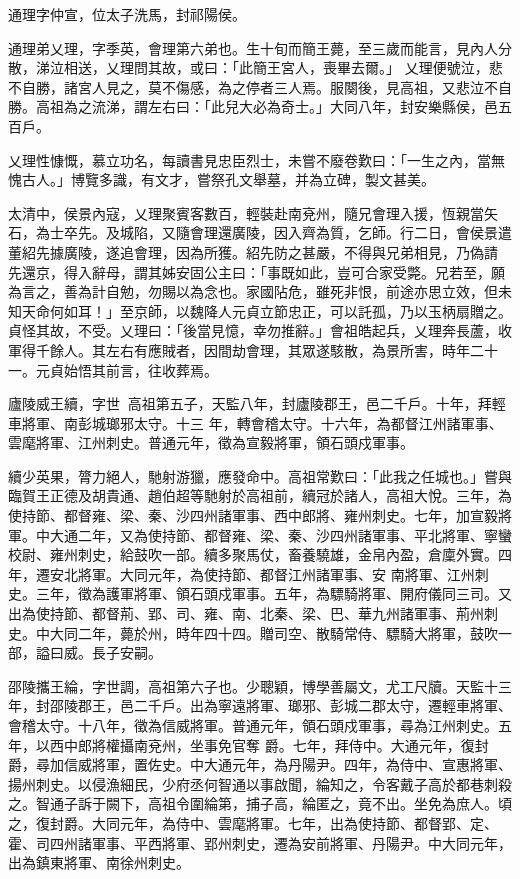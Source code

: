 \begin{pinyinscope}
 通理字仲宣，位太子洗馬，封祁陽侯。



 通理弟乂理，字季英，會理第六弟也。生十旬而簡王薨，至三歲而能言，見內人分散，涕泣相送，乂理問其故，或曰：「此簡王宮人，喪畢去爾。」
 乂理便號泣，悲不自勝，諸宮人見之，莫不傷感，為之停者三人焉。服闋後，見高祖，又悲泣不自勝。高祖為之流涕，謂左右曰：「此兒大必為奇士。」大同八年，封安樂縣侯，邑五百戶。



 乂理性慷慨，慕立功名，每讀書見忠臣烈士，未嘗不廢卷歎曰：「一生之內，當無愧古人。」博覽多識，有文才，嘗祭孔文舉墓，并為立碑，製文甚美。



 太清中，侯景內寇，乂理聚賓客數百，輕裝赴南兗州，隨兄會理入援，恆親當矢石，為士卒先。及城陷，又隨會理還廣陵，因入齊為質，乞師。行二日，會侯景遣董紹先據廣陵，遂追會理，因為所獲。紹先防之甚嚴，不得與兄弟相見，乃偽請
 先還京，得入辭母，謂其姊安固公主曰：「事既如此，豈可合家受斃。兄若至，願為言之，善為計自勉，勿賜以為念也。家國阽危，雖死非恨，前途亦思立效，但未知天命何如耳！」至京師，以魏降人元貞立節忠正，可以託孤，乃以玉柄扇贈之。貞怪其故，不受。乂理曰：「後當見憶，幸勿推辭。」會祖皓起兵，乂理奔長蘆，收軍得千餘人。其左右有應賊者，因間劫會理，其眾遂駭散，為景所害，時年二十一。元貞始悟其前言，往收葬焉。



 廬陵威王續，字世，高祖第五子，天監八年，封廬陵郡王，邑二千戶。十年，拜輕車將軍、南彭城瑯邪太守。十三
 年，轉會稽太守。十六年，為都督江州諸軍事、雲麾將軍、江州刺史。普通元年，徵為宣毅將軍，領石頭戍軍事。



 續少英果，膂力絕人，馳射游獵，應發命中。高祖常歎曰：「此我之任城也。」嘗與臨賀王正德及胡貴通、趙伯超等馳射於高祖前，續冠於諸人，高祖大悅。三年，為使持節、都督雍、梁、秦、沙四州諸軍事、西中郎將、雍州刺史。七年，加宣毅將軍。中大通二年，又為使持節、都督雍、梁、秦、沙四州諸軍事、平北將軍、寧蠻校尉、雍州刺史，給鼓吹一部。續多聚馬仗，畜養驍雄，金帛內盈，倉廩外實。四年，遷安北將軍。大同元年，為使持節、都督江州諸軍事、安
 南將軍、江州刺史。三年，徵為護軍將軍、領石頭戍軍事。五年，為驃騎將軍、開府儀同三司。又出為使持節、都督荊、郢、司、雍、南、北秦、梁、巴、華九州諸軍事、荊州刺史。中大同二年，薨於州，時年四十四。贈司空、散騎常侍、驃騎大將軍，鼓吹一部，謚曰威。長子安嗣。



 邵陵攜王綸，字世調，高祖第六子也。少聰穎，博學善屬文，尤工尺牘。天監十三年，封邵陵郡王，邑二千戶。出為寧遠將軍、瑯邪、彭城二郡太守，遷輕車將軍、會稽太守。十八年，徵為信威將軍。普通元年，領石頭戍軍事，尋為江州刺史。五年，以西中郎將權攝南兗州，坐事免官奪
 爵。七年，拜侍中。大通元年，復封爵，尋加信威將軍，置佐史。中大通元年，為丹陽尹。四年，為侍中、宣惠將軍、揚州刺史。以侵漁細民，少府丞何智通以事啟聞，綸知之，令客戴子高於都巷刺殺之。智通子訴于闕下，高祖令圍綸第，捕子高，綸匿之，竟不出。坐免為庶人。頃之，復封爵。大同元年，為侍中、雲麾將軍。七年，出為使持節、都督郢、定、霍、司四州諸軍事、平西將軍、郢州刺史，遷為安前將軍、丹陽尹。中大同元年，出為鎮東將軍、南徐州刺史。




\end{pinyinscope}
